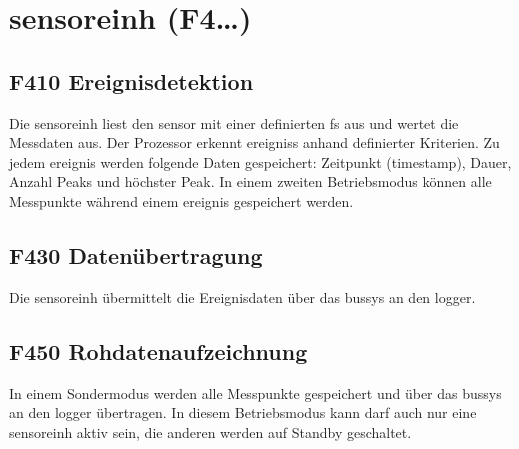 \section{\gls{sensoreinh} (F4\ldots)}


\subsection{F410 Ereignisdetektion}
Die \gls{sensoreinh} liest den \gls{sensor} mit einer definierten \gls{fs} aus und wertet die Messdaten aus. Der Prozessor erkennt \glspl{ereignis} anhand definierter Kriterien. Zu jedem \gls{ereignis} werden folgende Daten gespeichert: Zeitpunkt (\gls{timestamp}), Dauer, Anzahl Peaks und höchster Peak. In einem zweiten Betriebsmodus können alle Messpunkte während einem \gls{ereignis} gespeichert werden.


\subsection{F430 Datenübertragung}
Die \gls{sensoreinh} übermittelt die Ereignisdaten über das \gls{bussys} an den \gls{logger}.


\subsection{F450 Rohdatenaufzeichnung}
In einem Sondermodus werden alle Messpunkte gespeichert und über das \gls{bussys} an den \gls{logger} übertragen. In diesem Betriebsmodus kann darf auch nur eine \gls{sensoreinh} aktiv sein, die anderen werden auf Standby geschaltet.


